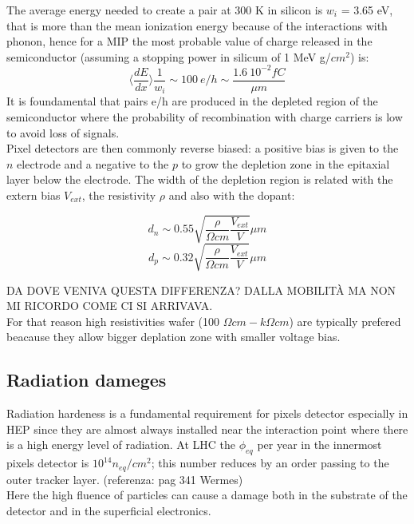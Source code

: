       The average energy needed to create a pair at 300 K in silicon is $w_i$ = 3.65 eV, that is more than the mean ionization energy because of the interactions with phonon, hence for a MIP the most probable value of charge released in the semiconductor (assuming a stopping power in silicum of 1 MeV g/$cm^2$) is: 
      \begin{equation}
         \langle \frac{dE}{dx}\rangle \frac{1}{w_i} \sim 100 \: e/h \sim \frac{1.6 \:10^{-2}fC}{\mu m}
      \end{equation}
      It is foundamental that pairs e/h are produced in the depleted region of the semiconductor where the probability of recombination with charge carriers is low to avoid loss of signals.\\
      Pixel detectors are then commonly reverse biased: a positive bias is given to the $n$ electrode and a negative to the $p$
      to grow the depletion zone in the epitaxial layer below the electrode. The width of the depletion region is related with the extern bias $V_{ext}$, the resistivity $\rho$ and also with the dopant:
      \begin{multicols}{2}
         \begin{equation}
            d_{n} \sim 0.55 \sqrt{\frac{\rho}{\Omega cm}\frac{V_{ext}}{V}} \mu m 
         \end{equation}\break
         \begin{equation}
            d_{p} \sim 0.32 \sqrt{\frac{\rho}{\Omega cm}\frac{V_{ext}}{V}} \mu m
         \end{equation}
         \label{eq:deplation_d}
      \end{multicols}
      DA DOVE VENIVA QUESTA DIFFERENZA? DALLA MOBILITÀ MA NON MI RICORDO COME CI SI ARRIVAVA.\\
      For that reason high resistivities wafer (100 $\Omega cm - k\Omega cm$) are typically prefered beacause they allow bigger deplation zone with smaller voltage bias. 

   \subsection{Radiation dameges}
      Radiation hardeness is a fundamental requirement for pixels detector especially in HEP since they are almost always installed near the interaction point where there is a high energy level of radiation. At LHC the $\phi_{eq}$ per year in the innermost pixels detector is $10^{14} n_{eq}/cm^2$; this number reduces by an order passing to the outer tracker layer. (referenza: pag 341 Wermes)\\ 
      Here the high fluence of particles can cause a damage both in the substrate of the detector and in the superficial electronics. 
      
